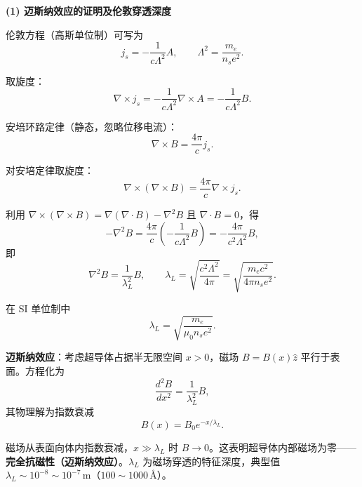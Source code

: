 \begin{derivationbox}[标准解题过程]
\textbf{(1) 迈斯纳效应的证明及伦敦穿透深度}

伦敦方程（高斯单位制）可写为
\begin{equation}
j_s=-\frac{1}{c\Lambda^2}A,\qquad \Lambda^2=\frac{m_e}{n_se^2}.
\end{equation}

取旋度：
\begin{equation}
\nabla\times j_s=-\frac{1}{c\Lambda^2}\nabla\times A=-\frac{1}{c\Lambda^2}B.
\end{equation}

安培环路定律（静态，忽略位移电流）：
\begin{equation}
\nabla\times B=\frac{4\pi}{c}j_s.
\end{equation}

对安培定律取旋度：
\begin{equation}
\nabla\times(\nabla\times B)=\frac{4\pi}{c}\nabla\times j_s.
\end{equation}

利用 $\nabla\times(\nabla\times B)=\nabla(\nabla\cdot B)-\nabla^2B$ 且 $\nabla\cdot B=0$，得
\begin{equation}
-\nabla^2B=\frac{4\pi}{c}\left(-\frac{1}{c\Lambda^2}B\right)=-\frac{4\pi}{c^2\Lambda^2}B,
\end{equation}
即
\begin{equation}
\nabla^2B=\frac{1}{\lambda_L^2}B,\qquad \lambda_L=\sqrt{\frac{c^2\Lambda^2}{4\pi}}=\sqrt{\frac{m_ec^2}{4\pi n_se^2}}.
\end{equation}

在 SI 单位制中
\begin{equation}
\boxed{\lambda_L=\sqrt{\frac{m_e}{\mu_0n_se^2}}.}
\end{equation}

\textbf{迈斯纳效应}：考虑超导体占据半无限空间 $x>0$，磁场 $B=B(x)\hat{z}$ 平行于表面。方程化为
\begin{equation}
\frac{d^2B}{dx^2}=\frac{1}{\lambda_L^2}B,
\end{equation}
其物理解为指数衰减
\begin{equation}
\boxed{B(x)=B_0e^{-x/\lambda_L}.}
\end{equation}

磁场从表面向体内指数衰减，$x\gg\lambda_L$ 时 $B\to0$。这表明超导体内部磁场为零——\textbf{完全抗磁性（迈斯纳效应）}。$\lambda_L$ 为磁场穿透的特征深度，典型值 $\lambda_L\sim10^{-8}\sim10^{-7}\,\text{m}$（$100\sim1000\,\text{\AA}$）。


\end{derivationbox}
